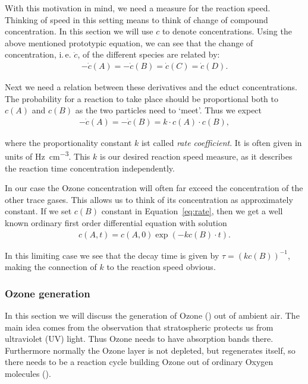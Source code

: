 With this motivation in mind, we need a measure for the reaction
speed. Thinking of speed in this setting means to think of change of
compound concentration. In this section we will use $c$ to denote
concentrations. Using the above mentioned prototypic equation, we can
see that the change of concentration, i.\,e. $\dot c$, of the
different species are related by:
\begin{align*}
  -\dot c(A) = - \dot c(B) = \dot c(C) = \dot c(D).
\end{align*}

Next we need a relation between these derivatives and the educt
concentrations. The probability for a reaction to take place should be
proportional both to $c(A)$ and $c(B)$ as the two particles need to
`meet'. Thus we expect
\begin{align}
  -\dot c(A) = - \dot c(B) = k \cdot c(A) \cdot c(B), \label{eq:rate}
\end{align}

where the proportionality constant $k$ ist called \emph{rate
  coefficient}. It is often given in units of
\si{\hertz\per\cubic\centi\meter}. This $k$ is our desired reaction
speed measure, as it describes the
reaction time concentration independently.

In our case the Ozone concentration will often far exceed the
concentration of the other trace gases. This allows us to think of its
concentration as approximately constant. If we set $c(B)$ constant in
Equation~\eqref{eq:rate}, then we get a well known ordinary first
order differential equation with solution
\begin{align*}
  c(A,t) = c(A,0)\exp(-kc(B)\cdot t).
\end{align*}

In this limiting case we see that the decay time is given by $\tau =
(kc(B))^{-1}$, making the connection of $k$ to the reaction speed
obvious.

\subsubsection{Ozone generation}
\label{sec:theory-ozone}

In this section we will discuss the generation of Ozone () out of ambient
air. The main idea comes from the observation that stratospheric
 protects us from ultraviolet (UV) light. Thus Ozone needs to
have absorption bands there. Furthermore normally the Ozone layer is
not depleted, but regenerates itself, so there needs to be a reaction
cycle building Ozone out of ordinary Oxygen molecules ().

